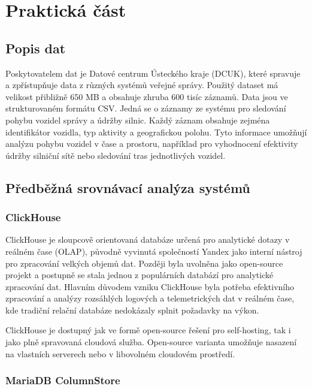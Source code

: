 \chapter{Praktická část}

\section{Popis dat}

Poskytovatelem dat je Datové centrum Ústeckého kraje (DCUK), které spravuje a zpřístupňuje data z různých systémů veřejné správy.
Použitý dataset má velikost přibližně 650 MB a obsahuje zhruba 600 tisíc záznamů. Data jsou ve strukturovaném formátu CSV.
Jedná se o záznamy ze systému pro sledování pohybu vozidel správy a údržby silnic. 
Každý záznam obsahuje zejména identifikátor vozidla, typ aktivity a geografickou polohu. 
Tyto informace umožňují analýzu pohybu vozidel v čase a prostoru, například pro vyhodnocení efektivity údržby silniční sítě nebo sledování tras jednotlivých vozidel.

\section{Předběžná srovnávací analýza systémů}

\subsection{ClickHouse}

ClickHouse je sloupcově orientovaná databáze určená pro analytické dotazy v reálném čase (OLAP), původně vyvinutá společností Yandex jako interní nástroj pro zpracování velkých objemů dat. 
Později byla uvolněna jako open-source projekt a postupně se stala jednou z populárních databází pro analytické zpracování dat. \cite{clickhouseintro}
Hlavním důvodem vzniku ClickHouse byla potřeba efektivního zpracování a analýzy rozsáhlých logových a telemetrických dat v reálném čase, kde tradiční relační databáze nedokázaly splnit požadavky na výkon.

ClickHouse je dostupný jak ve formě open-source řešení pro self-hosting, tak i jako plně spravovaná cloudová služba. Open-source varianta umožňuje nasazení na vlastních serverech nebo v libovolném cloudovém prostředí.

\subsection{MariaDB ColumnStore}

